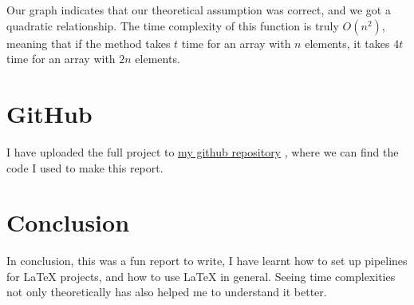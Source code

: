 \documentclass[a4paper,11pt]{article}
\newcommand{\underlinehref}[2]{%
  \href{#1}{\ul{#2}}%
}
\begin{document}
Our graph indicates that our theoretical assumption was correct, and we got a quadratic relationship.
The time complexity of this function is truly $O(n^2)$, meaning that if the method takes $t$ time for an array with $n$ elements, it takes $4t$ time for an array with $2n$ elements.

\section*{GitHub}

I have uploaded the full project to \underlinehref{https://github.com/peterherczku/ID1021/tree/main/assignment-1}{my github repository}, where we can find the code I used to make this report.

\section*{Conclusion}

In conclusion, this was a fun report to write, I have learnt how to set up pipelines for LaTeX projects, and how to use LaTeX in general.
Seeing time complexities not only theoretically has also helped me to understand it better.
\end{document}
